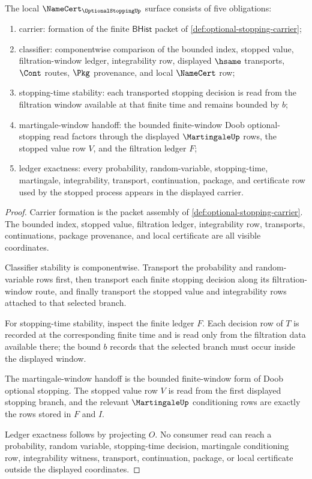 \begin{theorem}
\label{thm:optional-stopping-namecert-obligations}
The local $\NameCert_{\OptionalStoppingUp}$ surface consists of five obligations:
\begin{enumerate}
\item carrier: formation of the finite $\mathsf{BHist}$ packet of \autoref{def:optional-stopping-carrier};
\item classifier: componentwise comparison of the bounded index, stopped value, filtration-window ledger, integrability row, displayed $\hsame$ transports, $\Cont$ routes, $\Pkg$ provenance, and local $\NameCert$ row;
\item stopping-time stability: each transported stopping decision is read from the filtration window available at that finite time and remains bounded by $b$;
\item martingale-window handoff: the bounded finite-window Doob optional-stopping read factors through the displayed $\MartingaleUp$ rows, the stopped value row $V$, and the filtration ledger $F$;
\item ledger exactness: every probability, random-variable, stopping-time, martingale, integrability, transport, continuation, package, and certificate row used by the stopped process appears in the displayed carrier.
\end{enumerate}
\end{theorem}
\begin{proof}
Carrier formation is the packet assembly of \autoref{def:optional-stopping-carrier}. The bounded index, stopped value, filtration ledger, integrability row, transports, continuations, package provenance, and local certificate are all visible coordinates.

Classifier stability is componentwise. Transport the probability and random-variable rows first, then transport each finite stopping decision along its filtration-window route, and finally transport the stopped value and integrability rows attached to that selected branch.

For stopping-time stability, inspect the finite ledger $F$. Each decision row of $T$ is recorded at the corresponding finite time and is read only from the filtration data available there; the bound $b$ records that the selected branch must occur inside the displayed window.

The martingale-window handoff is the bounded finite-window form of Doob optional stopping. The stopped value row $V$ is read from the first displayed stopping branch, and the relevant $\MartingaleUp$ conditioning rows are exactly the rows stored in $F$ and $I$.

Ledger exactness follows by projecting $O$. No consumer read can reach a probability, random variable, stopping-time decision, martingale conditioning row, integrability witness, transport, continuation, package, or local certificate outside the displayed coordinates.
\end{proof}

